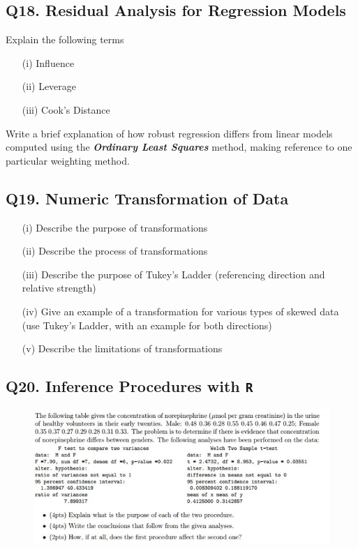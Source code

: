 \documentclass[a4paper,12pt]{article}
\begin{document}
\subsection*{Q18. Residual Analysis for Regression Models} %
Explain the following terms
\begin{itemize}
\item[(i)]	Influence
\item[(ii)]	Leverage
\item[(iii)]	Cook’s Distance
\end{itemize}
Write a brief explanation of how robust regression differs from linear models computed using the \textbf{\textit{Ordinary Least Squares}} method, making reference to one particular weighting method.



\subsection*{Q19. Numeric Transformation of Data} %


\begin{itemize}
	\item[(i)] Describe the purpose of transformations
	\item[(ii)] Describe the process of transformations
	\item[(iii)] Describe the purpose of Tukey's Ladder (referencing direction and relative strength)
	\item[(iv)] Give an example of a transformation for various types of skewed data (use Tukey's Ladder, with an example for both directions)
	\item[(v)] Describe the limitations of transformations
\end{itemize}

\subsection*{Q20. Inference Procedures with \texttt{R}} %
\begin{figure}[h!]
\centering
\includegraphics[width=1.1\linewidth]{images/Q20REview}
\end{figure}
\newpage
\end{document}
